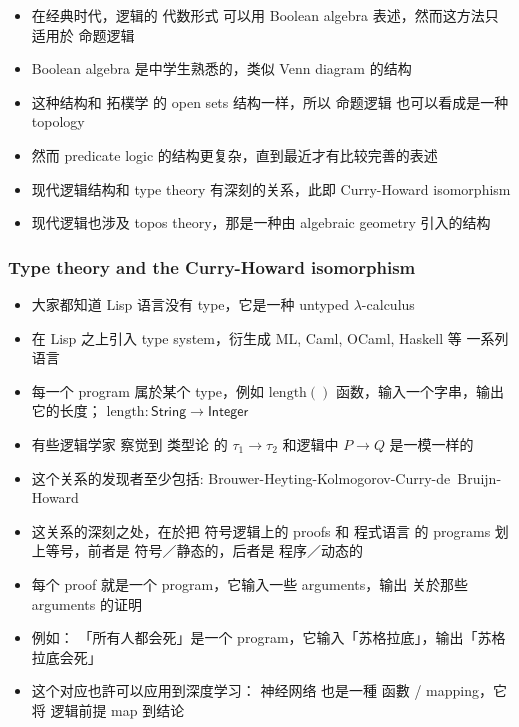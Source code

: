 \documentclass[16pt]{beamer}
\begin{document}
\begin{frame}[plain]
\begin{itemize}
	\item 在经典时代，逻辑的 代数形式 可以用 Boolean algebra 表述，然而这方法只适用於 命题逻辑
	\item Boolean algebra 是中学生熟悉的，类似 Venn diagram 的结构
	\item 这种结构和 拓樸学 的 open sets 结构一样，所以 命题逻辑 也可以看成是一种 topology
	\item 然而 predicate logic 的结构更复杂，直到最近才有比较完善的表述
	\item 现代逻辑结构和 type theory 有深刻的关系，此即 Curry-Howard isomorphism
	\item 现代逻辑也涉及 topos theory，那是一种由 algebraic geometry 引入的结构
\end{itemize}
\end{frame}

\begin{frame}
\frametitle{Type theory and the Curry-Howard isomorphism}
\begin{itemize}
	\item 大家都知道 Lisp 语言没有 type，它是一种 untyped $\lambda$-calculus
	\item 在 Lisp 之上引入 type system，衍生成 ML, Caml, OCaml, Haskell 等 一系列语言
	\item 每一个 program 属於某个 type，例如 $\mathrm{length}()$ 函数，输入一个字串，输出它的长度； $\mathrm{length} : \mathsf{String} \rightarrow \mathsf{Integer}$
	\item 有些逻辑学家 察觉到 类型论 的 $\tau_1 \rightarrow \tau_2$ 和逻辑中 $P \rightarrow Q$ 是一模一样的
	\item 这个关系的发现者至少包括:  Brouwer-Heyting-Kolmogorov-Curry-\mbox{de Bruijn}-Howard
	\item 这关系的深刻之处，在於把 符号逻辑上的 proofs 和 程式语言 的 programs 划上等号，前者是 符号／静态的，后者是 程序／动态的
	\item 每个 proof 就是一个 program，它输入一些 arguments，输出 关於那些 arguments 的证明
	\item 例如： 「所有人都会死」是一个 program，它输入「苏格拉底」，输出「苏格拉底会死」 
	\item 这个对应也許可以应用到深度学习： 神经网络 也是一種 函數 / mapping，它将 逻辑前提 map 到结论
\end{itemize}
\end{frame}
\end{document}
